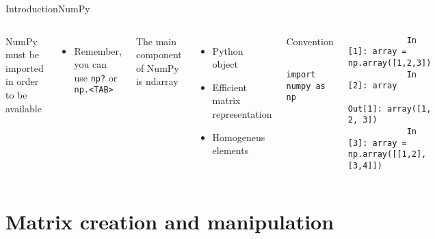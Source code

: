\documentclass[10pt,compress]{beamer} %
\begin{document}
\begin{frame}[fragile]{Introduction}{NumPy}
	\begin{columns}
		NumPy must be imported in order to be available
		\begin{itemize}
			\item Remember, you can use \texttt{np?} or \texttt{np.<TAB>}
		\end{itemize}

		The main component of NumPy is \alert{ndarray}
		\begin{itemize}
			\item Python object
			\item Efficient matrix representation
			\item Homogeneus elements
		\end{itemize}

		\begin{block}{\footnotesize{Convention}}
		\vspace{-0.2cm} 
			\begin{lstlisting}
			import numpy as np
			\end{lstlisting}
		\vspace{-0.2cm} 
		\end{block}

		\begin{exampleblock}{}
		\vspace{-0.2cm} 
			\begin{lstlisting}
			In [1]: array = np.array([1,2,3])
			In [2]: array
			Out[1]: array([1, 2, 3])
			In [3]: array = np.array([[1,2],[3,4]])
			\end{lstlisting}
		\vspace{-0.2cm} 
		\end{exampleblock}
	\end{columns}
\end{frame}

\section{Matrix creation and manipulation}
\end{document}
